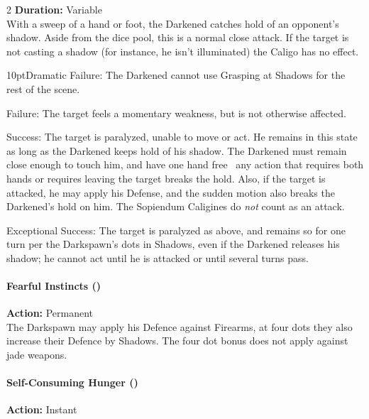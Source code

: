 \begin{multicols}{2}
\noindent \textbf{Duration:} Variable \\

\noindent With a sweep of a hand or foot, the Darkened catches hold of an opponent's shadow. Aside from the dice pool, this is a normal close attack. If the target is not casting a shadow (for instance, he isn't illuminated) the Caligo has no effect.

    \begin{myindentpar}{10pt}Dramatic Failure: The Darkened cannot use Grasping at Shadows for the rest of the scene.
    
    Failure: The target feels a momentary weakness, but is not otherwise affected.
    
    Success: The target is paralyzed, unable to move or act. He remains in this state as long as the Darkened keeps hold of his shadow. The Darkened must remain close enough to touch him, and have one hand free \textendash\, any action that requires both hands or requires leaving the target breaks the hold. Also, if the target is attacked, he may apply his Defense, and the sudden motion also breaks the Darkened's hold on him. The Sopiendum Caligines do \textit{not} count as an attack.
    
    Exceptional Success: The target is paralyzed as above, and remains so for one turn per the Darkspawn's dots in Shadows, even if the Darkened releases his shadow; he cannot act until he is attacked or until several turns pass.\end{myindentpar}
	
\paragraph*{Fearful Instincts (\textbullet\textbullet\textbullet \textemdash \textbullet\textbullet\textbullet\textbullet)} 

\noindent \textbf{Action:} Permanent\\

The Darkspawn may apply his Defence against Firearms, at four dots they also increase their Defence by Shadows. The four dot bonus does not apply against jade weapons. 
   
\paragraph*{Self-Consuming Hunger (\textbullet\textbullet\textbullet)}

\noindent \textbf{Action:} Instant\\


\end{multicols}
